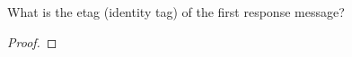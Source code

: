 \documentclass[../../main.tex]{subfiles}
\begin{document}
\begin{wts}
What is the etag (identity tag) of the first response message?
\end{wts}
\begin{proof}

\end{proof}
\end{document}
